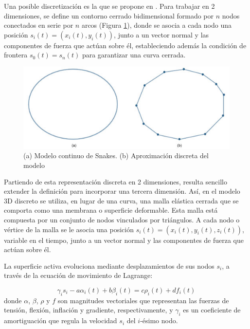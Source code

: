 Una posible discretización es la que se propone en \citep{mcinerney2000t}. Para trabajar en 2 dimensiones, se define un contorno cerrado bidimensional formado por $n$ nodos conectados en serie por $n$ arcos (Figura \ref{fig:modelo_continuo_snakes}), donde se asocia a cada nodo una posición $s_{i}(t) = (x_{i}(t),y_{i}(t))$, junto a un vector normal y las componentes de fuerza que actúan sobre él, estableciendo además la condición de frontera $s_{0}(t)=s_{n}(t)$ para garantizar una curva cerrada.

\begin{figure}[H]
	\centering
	\includegraphics[scale=0.6]{images/ovalo_continuo_vs_discreto.jpg}
	\caption{(a) Modelo continuo de Snakes. (b) Aproximación discreta del modelo}
	\label{fig:modelo_continuo_snakes}
\end{figure}

Partiendo de esta representación discreta en 2 dimensiones, resulta sencillo extender la definición para incorporar una tercera dimensión. Así, en el modelo 3D discreto se utiliza, en lugar de una curva, una malla elástica cerrada que se comporta como una membrana o superficie deformable. Esta malla está compuesta por un conjunto de nodos vinculados por triángulos. A cada nodo o vértice de la malla se le asocia una posición $s_{i}(t)=(x_{i}(t),y_{i}(t), z_{i}(t))$, variable en el tiempo, junto a un vector normal y las componentes de fuerza que actúan sobre él.

La superficie activa evoluciona mediante desplazamientos de sus nodos $s_{i}$, a través de la ecuación de movimiento de Lagrange:

%
\begin{equation}
\gamma_{i}s_{i} - a\alpha_{i}(t) + b\beta_{i}(t) = c\rho_{i}(t) + df_{i}(t)
\end{equation}
%
donde $\alpha$, $\beta$, $\rho$  y $f$ son magnitudes vectoriales que representan las fuerzas de tensión, flexión, inflación y gradiente, respectivamente, y $\gamma_{i}$ es un coeficiente de amortiguación que regula la velocidad $s_{i}$ del $i$-ésimo nodo.

